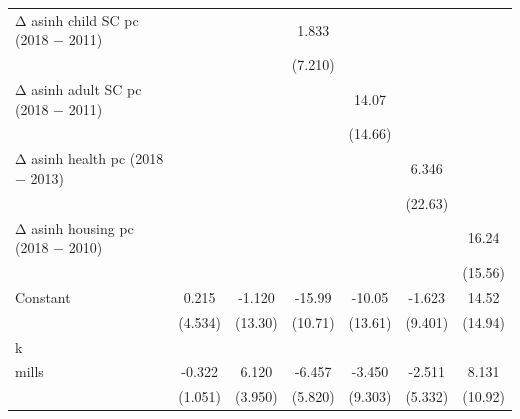 \begin{table}[htbp]
\begin{tabular}{l*{6}{c}}
\addlinespace
Δ asinh child SC pc (2018 − 2011)&                     &                     &       1.833         &                     &                     &                     \\
                    &                     &                     &     (7.210)         &                     &                     &                     \\
\addlinespace
Δ asinh adult SC pc (2018 − 2011)&                     &                     &                     &       14.07         &                     &                     \\
                    &                     &                     &                     &     (14.66)         &                     &                     \\
\addlinespace
Δ asinh health pc (2018 − 2013)&                     &                     &                     &                     &       6.346         &                     \\
                    &                     &                     &                     &                     &     (22.63)         &                     \\
\addlinespace
Δ asinh housing pc (2018 − 2010)&                     &                     &                     &                     &                     &       16.24         \\
                    &                     &                     &                     &                     &                     &     (15.56)         \\
\addlinespace
Constant            &       0.215         &      -1.120         &      -15.99         &      -10.05         &      -1.623         &       14.52         \\
                    &     (4.534)         &     (13.30)         &     (10.71)         &     (13.61)         &     (9.401)         &     (14.94)         \\
\midrule
k                   &                     &                     &                     &                     &                     &                     \\
mills               &      -0.322         &       6.120         &      -6.457         &      -3.450         &      -2.511         &       8.131         \\
                    &     (1.051)         &     (3.950)         &     (5.820)         &     (9.303)         &     (5.332)         &     (10.92)         \\

\end{tabular}
\end{table}
